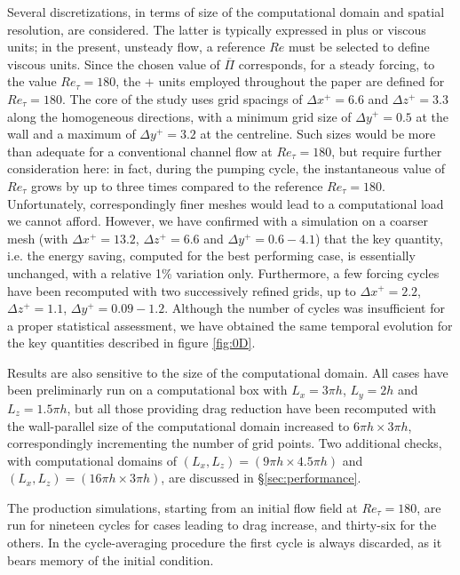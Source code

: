 \documentclass[lineno]{jfm}
\begin{document}
Several discretizations, in terms of size of the computational domain and spatial resolution, are considered. 
The latter is typically expressed in plus or viscous units; in the present, unsteady flow, a reference $Re$ must be selected to define viscous units. Since the chosen value of $\overline{\Pi}$ corresponds, for a steady forcing, to the value $Re_\tau=180$, the $+$ units employed throughout the paper are defined for $Re_\tau=180$.
The core of the study uses grid spacings of $\Delta x^+ = 6.6$ and $\Delta z^+ = 3.3$ along the homogeneous directions, with a minimum grid size of $\Delta y^+ = 0.5$ at the wall and a maximum of $\Delta y^+ =  3.2$ at the centreline.
Such sizes would be more than adequate for a conventional channel flow at 
$Re_\tau = 180$, but require further consideration here: in fact, during the pumping cycle, the instantaneous value of $Re_\tau$ grows by up to three times compared to the reference $Re_\tau=180$. Unfortunately, correspondingly finer meshes would lead to a computational load we cannot afford.
However, we have confirmed with a simulation on a coarser mesh (with $\Delta x^+ = 13.2$, $\Delta z^+ = 6.6$ and $\Delta y^+ = 0.6 - 4.1$) that the key quantity, i.e. the energy saving, computed for the best performing case, is essentially unchanged, with a relative 1\% variation only. 
Furthermore, a few forcing cycles have been recomputed with two successively refined grids, up to $\Delta x^+ = 2.2$, $\Delta z^+ = 1.1$, $\Delta y^+ = 0.09 - 1.2$. Although the number of cycles was insufficient for a proper statistical assessment, we have obtained the same temporal evolution for the key quantities described in figure \ref{fig:0D}.

Results are also sensitive to the size of the computational domain. All cases have been preliminarly run on a computational box with $L_x= 3 \pi h$, $L_y=2h$ and $L_z = 1.5 \pi h$, but all those providing drag reduction have been recomputed with the wall-parallel size of the computational domain increased to $6 \pi h \times 3 \pi h$, correspondingly incrementing the number of grid points. Two additional checks, with computational domains of $(L_x,L_z) = (9 \pi h \times 4.5 \pi h)$ and $(L_x,L_z) = (16 \pi h \times 3 \pi h)$, are discussed in \S\ref{sec:performance}.

The production simulations, starting from an initial flow field at $Re_\tau=180$, are run for nineteen cycles for cases leading to drag increase, and thirty-six for the others. In the cycle-averaging procedure the first cycle is always discarded, as it bears memory of the initial condition.
\end{document}
